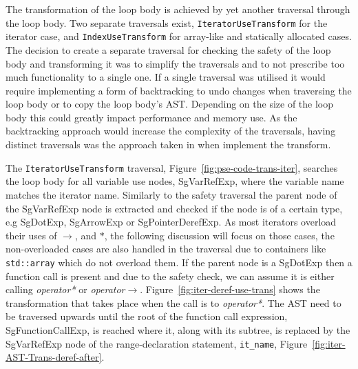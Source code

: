 \documentclass[bsc,frontabs,singlespacing,twoside,parskip,deptreport]{infthesis}
\begin{document}
The transformation of the loop body is achieved by yet another traversal through the loop body. Two separate traversals exist, \texttt{IteratorUseTransform} for the iterator case, and \texttt{IndexUseTransform} for array-like and statically allocated cases. The decision to create a separate traversal for checking the safety of the loop body and transforming it was to simplify the traversals and to not prescribe too much functionality to a single one. If a single traversal was utilised it would require implementing a form of backtracking to undo changes when traversing the loop body or to copy the loop body's AST. Depending on the size of the loop body this could greatly impact performance and memory use. As the backtracking approach would increase the complexity of the traversals, having distinct traversals was the approach taken in when implement the transform.




The \texttt{IteratorUseTransform} traversal, Figure~\ref{fig:pse-code-trans-iter}, searches the loop body for all variable use nodes, SgVarRefExp, where the variable name matches the iterator name. Similarly to the safety traversal the parent node of the SgVarRefExp node is extracted and checked  if the node is of a certain type, e.g SgDotExp, SgArrowExp or SgPointerDerefExp. As most iterators overload their uses of $\rightarrow$, and $*$, the following discussion will focus on those cases, the non-overloaded cases are also handled in the traversal due to containers like \texttt{std::array} which do not overload them. If the parent node is a SgDotExp then a function call is present and due to the safety check, we can assume it is either calling \textit{operator*} or \textit{operator$\rightarrow$}. Figure~\ref{fig:iter-deref-use-trans} shows the transformation that takes place when the call is to \textit{operator*}. The AST need to be traversed upwards until the root of the function call expression, SgFunctionCallExp, is reached where it, along with its subtree, is replaced by the SgVarRefExp node of the range-declaration statement, \texttt{it\_name}, Figure~\ref{fig:iter-AST-Trans-deref-after}. 
\end{document}
